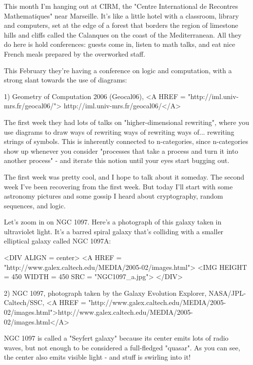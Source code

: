 



This month I'm hanging out at CIRM, the "Centre International de Recontres 
Mathematiques" near Marseille.  It's like a little hotel with a classroom, 
library and computers, set at the edge of a forest that borders the
region of limestone hills and cliffs called the Calanques on the coast 
of the Mediterranean.  All they do here is hold conferences: guests come
in, listen to math talks, and eat nice French meals prepared by the 
overworked staff.  

This February they're having a conference on logic and computation, 
with a strong slant towards the use of diagrams:

1) Geometry of Computation 2006 (Geocal06), 
<A HREF = "http://iml.univ-mrs.fr/geocal06/">
http://iml.univ-mrs.fr/geocal06/</A>

The first week they had lots of talks on "higher-dimensional rewriting",
where you use diagrams to draw ways of rewriting ways of rewriting ways
of... rewriting strings of symbols.  This is inherently connected to
n-categories, since n-categories show up whenever you consider "processes 
that take a process and turn it into another process" - and iterate 
this notion until your eyes start bugging out.  

The first week was pretty cool, and I hope to talk about it someday.
The second week I've been recovering from the first week.  But today
I'll start with some astronomy pictures and some gossip I heard about 
cryptography, random sequences, and logic.

Let's zoom in on NGC 1097.
Here's a photograph of this galaxy taken in ultraviolet
light.  It's a barred spiral galaxy that's colliding with a smaller
elliptical galaxy called NGC 1097A:

<DIV ALIGN = center>
<A HREF = "http://www.galex.caltech.edu/MEDIA/2005-02/images.html">
<IMG HEIGHT = 450 WIDTH = 450 SRC = "NGC1097_a.jpg">
</DIV>

2) NGC 1097, photograph taken by the Galaxy Evolution Explorer, 
NASA/JPL-Caltech/SSC, <A HREF = "http://www.galex.caltech.edu/MEDIA/2005-02/images.html">http://www.galex.caltech.edu/MEDIA/2005-02/images.html</A>

NGC 1097 is called a "Seyfert galaxy" because its center emits lots 
of radio waves, but not enough to be considered a full-fledged "quasar".  
As you can see, the center also emits visible light - and stuff is
swirling into it!

